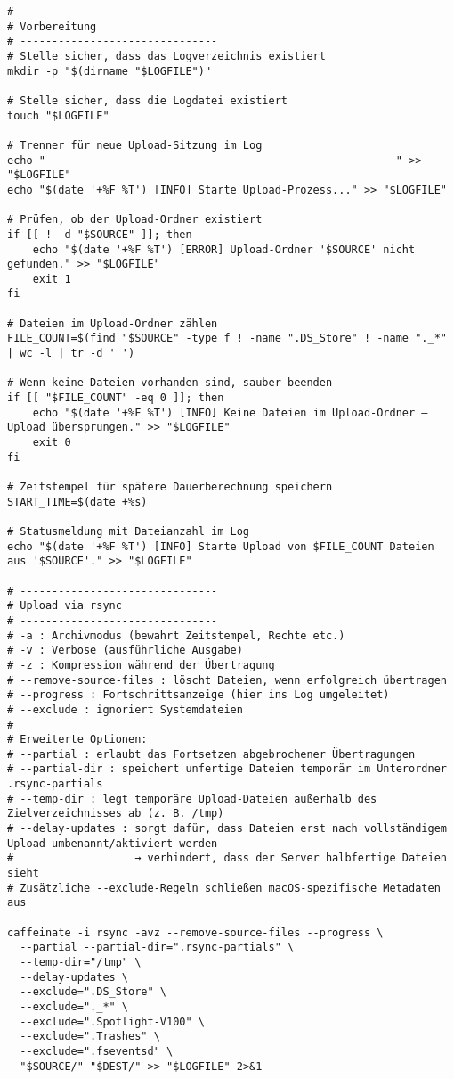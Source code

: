 \documentclass[12pt,a4paper]{report}
\begin{document}
\begin{enumerate}
\begin{verbatim}
# -------------------------------
# Vorbereitung
# -------------------------------
# Stelle sicher, dass das Logverzeichnis existiert
mkdir -p "$(dirname "$LOGFILE")"

# Stelle sicher, dass die Logdatei existiert
touch "$LOGFILE"

# Trenner für neue Upload-Sitzung im Log
echo "-------------------------------------------------------" >> "$LOGFILE"
echo "$(date '+%F %T') [INFO] Starte Upload-Prozess..." >> "$LOGFILE"

# Prüfen, ob der Upload-Ordner existiert
if [[ ! -d "$SOURCE" ]]; then
    echo "$(date '+%F %T') [ERROR] Upload-Ordner '$SOURCE' nicht gefunden." >> "$LOGFILE"
    exit 1
fi

# Dateien im Upload-Ordner zählen
FILE_COUNT=$(find "$SOURCE" -type f ! -name ".DS_Store" ! -name "._*" | wc -l | tr -d ' ')

# Wenn keine Dateien vorhanden sind, sauber beenden
if [[ "$FILE_COUNT" -eq 0 ]]; then
    echo "$(date '+%F %T') [INFO] Keine Dateien im Upload-Ordner – Upload übersprungen." >> "$LOGFILE"
    exit 0
fi

# Zeitstempel für spätere Dauerberechnung speichern
START_TIME=$(date +%s)

# Statusmeldung mit Dateianzahl im Log
echo "$(date '+%F %T') [INFO] Starte Upload von $FILE_COUNT Dateien aus '$SOURCE'." >> "$LOGFILE"

# -------------------------------
# Upload via rsync
# -------------------------------
# -a : Archivmodus (bewahrt Zeitstempel, Rechte etc.)
# -v : Verbose (ausführliche Ausgabe)
# -z : Kompression während der Übertragung
# --remove-source-files : löscht Dateien, wenn erfolgreich übertragen
# --progress : Fortschrittsanzeige (hier ins Log umgeleitet)
# --exclude : ignoriert Systemdateien
#
# Erweiterte Optionen:
# --partial : erlaubt das Fortsetzen abgebrochener Übertragungen
# --partial-dir : speichert unfertige Dateien temporär im Unterordner .rsync-partials
# --temp-dir : legt temporäre Upload-Dateien außerhalb des Zielverzeichnisses ab (z. B. /tmp)
# --delay-updates : sorgt dafür, dass Dateien erst nach vollständigem Upload umbenannt/aktiviert werden
#                   → verhindert, dass der Server halbfertige Dateien sieht
# Zusätzliche --exclude-Regeln schließen macOS-spezifische Metadaten aus

caffeinate -i rsync -avz --remove-source-files --progress \
  --partial --partial-dir=".rsync-partials" \
  --temp-dir="/tmp" \
  --delay-updates \
  --exclude=".DS_Store" \
  --exclude="._*" \
  --exclude=".Spotlight-V100" \
  --exclude=".Trashes" \
  --exclude=".fseventsd" \
  "$SOURCE/" "$DEST/" >> "$LOGFILE" 2>&1


\end{verbatim}
\end{enumerate}
\end{document}
